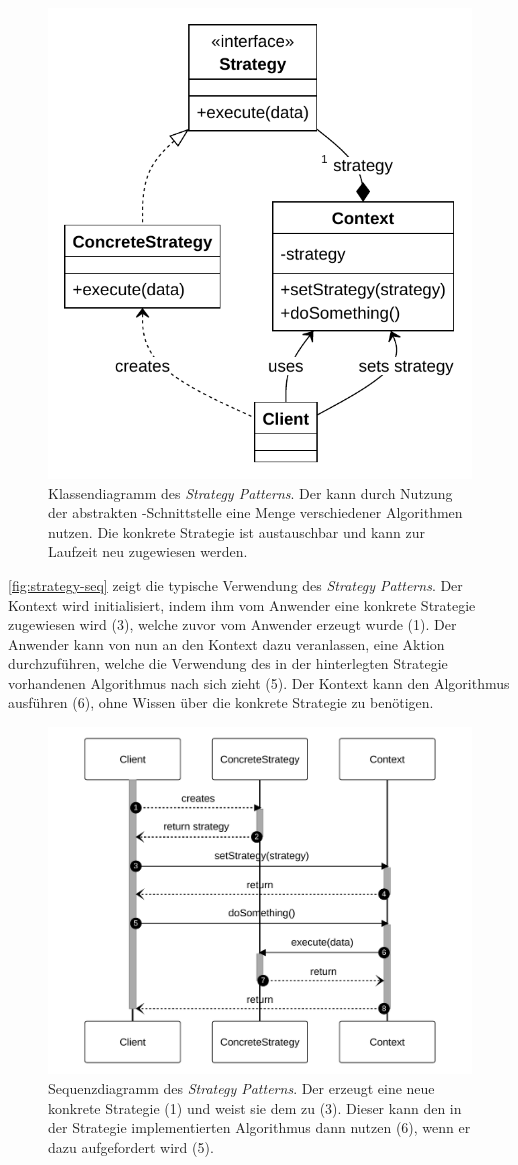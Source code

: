 \begin{figure}[!ht]
	\centering
	\includegraphics[width=0.6\linewidth]{images/patterns/strategy-class.pdf}
	\caption{Klassendiagramm des \emph{Strategy Patterns}. Der  kann durch Nutzung der abstrakten -Schnittstelle eine Menge verschiedener Algorithmen nutzen. Die konkrete Strategie ist austauschbar und kann zur Laufzeit neu zugewiesen werden. \cite{skobeleva_strategy_2023}}
	\label{fig:strategy-class}
\end{figure}

\autoref{fig:strategy-seq} zeigt die typische Verwendung des \emph{Strategy Patterns}. Der Kontext wird initialisiert, indem ihm vom Anwender eine konkrete Strategie zugewiesen wird (3), welche zuvor vom Anwender erzeugt wurde (1). Der Anwender kann von nun an den Kontext dazu veranlassen, eine Aktion durchzuführen, welche die Verwendung des in der hinterlegten Strategie vorhandenen Algorithmus nach sich zieht (5). Der Kontext kann den Algorithmus ausführen (6), ohne Wissen über die konkrete Strategie zu benötigen.

\begin{figure}[!ht]
	\centering
	\includegraphics[width=0.75\linewidth]{images/patterns/strategy-seq.pdf}
	\caption{Sequenzdiagramm des \emph{Strategy Patterns}. Der  erzeugt eine neue konkrete Strategie (1) und weist sie dem  zu (3). Dieser kann den in der Strategie implementierten Algorithmus dann nutzen (6), wenn er dazu aufgefordert wird (5). \cite{skobeleva_strategy_2023}}
	\label{fig:strategy-seq}
\end{figure}

